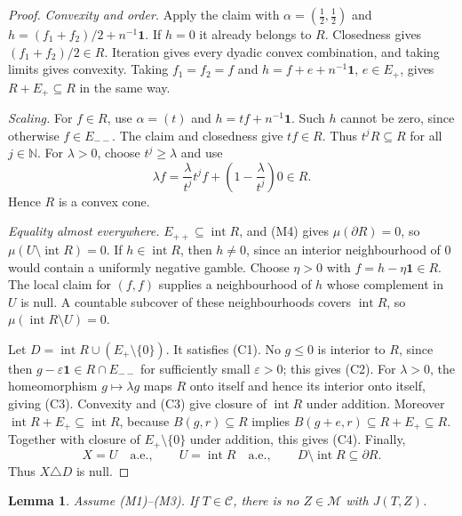 \documentclass[11pt]{article}
\newtheorem{lemma}[theorem]{Lemma}
\theoremstyle{definition}
\newcommand{\M}{\mathcal M}
\newcommand{\C}{\mathcal C}
\newcommand{\one}{\mathbf 1}
\newcommand{\interior}{\operatorname{int}}
\newcommand{\bd}{\partial}
\begin{document}
\begin{proof}
\emph{Convexity and order.} Apply the claim with $\alpha=(\tfrac12,\tfrac12)$ and $h=(f_1+f_2)/2+n^{-1}\one$. If $h=0$ it already belongs to $R$. Closedness gives $(f_1+f_2)/2\in R$. Iteration gives every dyadic convex combination, and taking limits gives convexity. Taking $f_1=f_2=f$ and $h=f+e+n^{-1}\one$, $e\in E_+$, gives $R+E_+\subseteq R$ in the same way.

\emph{Scaling.} For $f\in R$, use $\alpha=(t)$ and $h=tf+n^{-1}\one$. Such $h$ cannot be zero, since otherwise $f\in E_{--}$. The claim and closedness give $tf\in R$. Thus $t^jR\subseteq R$ for all $j\in\mathbb N$. For $\lambda>0$, choose $t^j\ge\lambda$ and use
\[
\lambda f=\frac{\lambda}{t^j}t^jf+\left(1-\frac{\lambda}{t^j}\right)0\in R.
\]
Hence $R$ is a convex cone.

\emph{Equality almost everywhere.} $E_{++}\subseteq\interior R$, and (M4) gives $\mu(\bd R)=0$, so $\mu(U\setminus\interior R)=0$. If $h\in\interior R$, then $h\ne0$, since an interior neighbourhood of $0$ would contain a uniformly negative gamble. Choose $\eta>0$ with $f=h-\eta\one\in R$. The local claim for $(f,f)$ supplies a neighbourhood of $h$ whose complement in $U$ is null. A countable subcover of these neighbourhoods covers $\interior R$, so $\mu(\interior R\setminus U)=0$.

Let $D=\interior R\cup(E_+\setminus\{0\})$. It satisfies (C1). No $g\le0$ is interior to $R$, since then $g-\varepsilon\one\in R\cap E_{--}$ for sufficiently small $\varepsilon>0$; this gives (C2). For $\lambda>0$, the homeomorphism $g\mapsto\lambda g$ maps $R$ onto itself and hence its interior onto itself, giving (C3). Convexity and (C3) give closure of $\interior R$ under addition. Moreover $\interior R+E_+\subseteq\interior R$, because $B(g,r)\subseteq R$ implies $B(g+e,r)\subseteq R+E_+\subseteq R$. Together with closure of $E_+\setminus\{0\}$ under addition, this gives (C4). Finally,
\[
X=U\quad\text{a.e.},\qquad U=\interior R\quad\text{a.e.},\qquad
D\setminus\interior R\subseteq\bd R.
\]
Thus $X\triangle D$ is null.
\end{proof}

\begin{lemma}\label{lem:noJ}
Assume (M1)--(M3). If $T\in\C$, there is no $Z\in\M$ with $J(T,Z)$.
\end{lemma}
\end{document}
